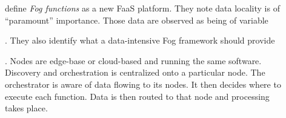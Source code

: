 \documentclass[11pt]{sdm}
\begin{document}
\begin{description}
	\item[\citet{cheng_fog_2019}] define \textit{Fog functions} as a new \gls{FaaS} platform. They note data locality is of ``paramount'' importance. Those data are observed as being of variable
	. They also identify what a data-intensive Fog framework should provide
	.
	Nodes are edge-base or cloud-based and running the same software. Discovery and orchestration is centralized onto a particular node. The orchestrator is aware of data flowing to its nodes. It then decides where to execute each function. Data is then routed to that node and processing takes place.
	

\end{description}
\end{document}
